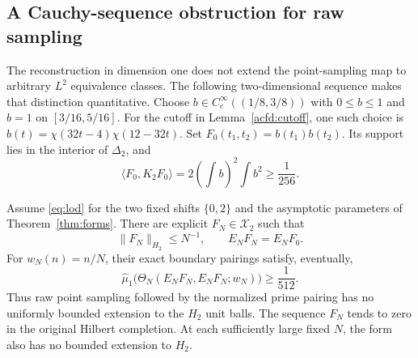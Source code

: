 \subsection{A Cauchy-sequence obstruction for raw sampling}

The reconstruction in dimension one does not extend the point-sampling map
to arbitrary $L^2$ equivalence classes.
The following two-dimensional sequence makes that distinction quantitative.
Choose $b\in C_c^\infty((1/8,3/8))$ with $0\leq b\leq1$ and
$b=1$ on $[3/16,5/16]$.
For the cutoff in Lemma~\ref{acfd:cutoff}, one such choice is
$b(t)=\chi(32t-4)\chi(12-32t)$.
Set $F_0(t_1,t_2)=b(t_1)b(t_2)$.
Its support lies in the interior of $\Delta_2$, and
\begin{equation}\label{acfr:positive-model}
 \langle F_0,K_2F_0\rangle
       =2\left(\int b\right)^2\int b^2\geq\frac1{256}.
\end{equation}

\begin{proposition}
\label{acfr:cauchy-obstruction}
Assume \eqref{eq:lod} for the two fixed shifts $\{0,2\}$ and the asymptotic
parameters of Theorem~\ref{thm:forms}.  There are explicit $F_N\in\mathcal X_2$ such that
\[
 \|F_N\|_{H_2}\leq N^{-1},\qquad E_NF_N=E_NF_0.
\]
For $w_N(n)=n/N$, their exact boundary pairings satisfy, eventually,
\begin{equation}\label{acfr:nonvanishing}
 \widehat\mu_1\bigl(\Theta_N(E_NF_N,E_NF_N;w_N)\bigr)
       \geq\frac1{512}.
\end{equation}
Thus raw point sampling followed by the normalized prime pairing has no
uniformly bounded extension to the $H_2$ unit balls.
The sequence $F_N$ tends to zero in the original Hilbert completion.
At each sufficiently large fixed $N$, the form also has no bounded extension to $H_2$.
\end{proposition}

